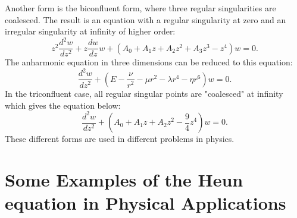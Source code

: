 \documentclass{article}
\begin{document}
 Another form
is the biconfluent form, where three regular singularities are
coalesced. The result is an equation with a regular singularity at
zero and an irregular singularity at infinity of higher order:
\begin{equation}
z^2 \frac {d^{2}w}{dz^{2}} + z \frac{dw}{dz}w +( A_0 + A_1 z + A_2
z^2 + A_3z^3 - z^4) w = 0 .
\end{equation}%
The anharmonic equation in three dimensions can be reduced to this
equation:
\begin{equation}
\frac {d^{2}w}{dz^{2}} +( E - \frac{\nu }{r^2} - \mu r^2 -\lambda
r^4 -\eta r^6 ) w = 0 .
\end{equation}%
In the triconfluent case, all regular singular points are
"coalesced" at infinity which gives the equation below:
\begin{equation}
\frac {d^{2}w}{dz^{2}} + (A_0 + A_1 z + A_2 z^2 -\frac{9}{4} z^4)
w = 0 .
\end{equation}%
These different forms are used in different  problems in physics.

\section{Some Examples of the Heun equation in Physical Applications}
\end{document}
